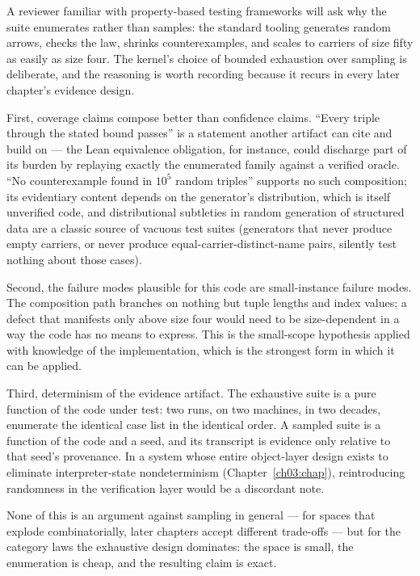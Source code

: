 A reviewer familiar with property-based testing frameworks will ask why
the suite enumerates rather than samples: the standard tooling generates
random arrows, checks the law, shrinks counterexamples, and scales to
carriers of size fifty as easily as size four. The kernel's choice of
bounded exhaustion over sampling is deliberate, and the reasoning is
worth recording because it recurs in every later chapter's evidence
design.

First, coverage claims compose better than confidence claims. ``Every
triple through the stated bound passes'' is a statement another artifact
can cite and build on --- the Lean equivalence obligation, for instance,
could discharge part of its burden by replaying exactly the enumerated
family against a verified oracle. ``No counterexample found in $10^{5}$
random triples'' supports no such composition; its evidentiary content
depends on the generator's distribution, which is itself unverified code,
and distributional subtleties in random generation of structured data are
a classic source of vacuous test suites (generators that never produce
empty carriers, or never produce equal-carrier-distinct-name pairs,
silently test nothing about those cases).

Second, the failure modes plausible for this code are small-instance
failure modes. The composition path branches on nothing but tuple
lengths and index values; a defect that manifests only above size four
would need to be size-dependent in a way the code has no means to
express. This is the small-scope hypothesis \cite{jackson} applied with
knowledge of the implementation, which is the strongest form in which it
can be applied.

Third, determinism of the evidence artifact. The exhaustive suite is a
pure function of the code under test: two runs, on two machines, in two
decades, enumerate the identical case list in the identical order. A
sampled suite is a function of the code and a seed, and its transcript is
evidence only relative to that seed's provenance. In a system whose
entire object-layer design exists to eliminate interpreter-state
nondeterminism (Chapter~\ref{ch03:chap}), reintroducing randomness in the
verification layer would be a discordant note.

None of this is an argument against sampling in general --- for spaces
that explode combinatorially, later chapters accept different trade-offs
--- but for the category laws the exhaustive design dominates: the space
is small, the enumeration is cheap, and the resulting claim is exact.

